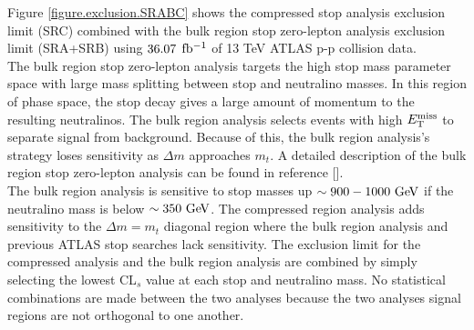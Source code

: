 \indent Figure \ref{figure.exclusion.SRABC} shows the compressed stop analysis exclusion limit (SRC) combined with the bulk region stop zero-lepton analysis exclusion limit (SRA+SRB) using $36.07$ $\mbox{fb$^{-1}$}$ of 13 TeV ATLAS p-p collision data.  \\

\indent The bulk region stop zero-lepton analysis targets the high stop mass parameter space with large mass splitting between stop and neutralino masses.  In this region of phase space, the stop decay gives a large amount of momentum to the resulting neutralinos.  The bulk region analysis selects events with high $E_{\mathrm{T}}^{\mathrm{miss}}$ to separate signal from background.   Because of this, the bulk region analysis's strategy loses sensitivity as $\Delta m$ approaches $m_{t}$.  A detailed description of the bulk region stop zero-lepton analysis can be found in reference [\cite{stop0LCONF}].  \\

\indent The bulk region analysis is sensitive to stop masses up $\sim900-1000 \gev$ if the neutralino mass is below $\sim350 \gev$. The compressed region analysis adds sensitivity to the $\Delta m = m_{t}$ diagonal region where the bulk region analysis and previous ATLAS stop searches lack sensitivity.  The exclusion limit for the compressed analysis and the bulk region analysis are combined by simply selecting the lowest CL$_s$ value at each stop and neutralino mass.  No statistical combinations are made between the two analyses because the two analyses signal regions are not orthogonal to one another. \\


